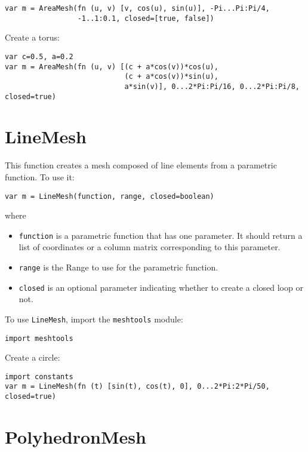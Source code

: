 \begin{lstlisting}
var m = AreaMesh(fn (u, v) [v, cos(u), sin(u)], -Pi...Pi:Pi/4,
                 -1..1:0.1, closed=[true, false])
\end{lstlisting}

Create a torus:

\begin{lstlisting}
var c=0.5, a=0.2
var m = AreaMesh(fn (u, v) [(c + a*cos(v))*cos(u),
                            (c + a*cos(v))*sin(u),
                            a*sin(v)], 0...2*Pi:Pi/16, 0...2*Pi:Pi/8, closed=true)
\end{lstlisting}

\hypertarget{linemesh}{%
\section{LineMesh}\label{linemesh}}

This function creates a mesh composed of line elements from a parametric
function. To use it:

\begin{lstlisting}
var m = LineMesh(function, range, closed=boolean)
\end{lstlisting}

where

\begin{itemize}

\item
  \texttt{function} is a parametric function that has one parameter. It
  should return a list of coordinates or a column matrix corresponding
  to this parameter.
\item
  \texttt{range} is the Range to use for the parametric function.
\item
  \texttt{closed} is an optional parameter indicating whether to create
  a closed loop or not.
\end{itemize}

To use \texttt{LineMesh}, import the \texttt{meshtools} module:

\begin{lstlisting}
import meshtools
\end{lstlisting}

Create a circle:

\begin{lstlisting}
import constants
var m = LineMesh(fn (t) [sin(t), cos(t), 0], 0...2*Pi:2*Pi/50, closed=true)
\end{lstlisting}

\hypertarget{polyhedronmesh}{%
\section{PolyhedronMesh}\label{polyhedronmesh}}

